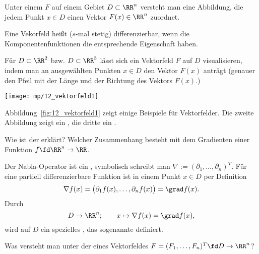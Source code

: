 \begin{antwort}
  Unter einem  $F$ auf einem Gebiet 
  $D\subset \RR^n$ versteht man eine Abbildung, die jedem Punkt $x\in D$ 
  einen Vektor $F(x)\in\RR^n$ zuordnet. 

  Eine Vekorfeld heißt ($s$-mal stetig) differenzierbar, wenn die 
  Komponentenfunktionen die entsprechende Eigenschaft haben.

  Für $D\subset\RR^2$ bzw. $D\subset\RR^3$ lässt sich ein Vektorfeld 
  $F$ auf $D$ visualisieren, indem man an ausgewählten 
  Punkten $x\in D$ den Vektor $F(x)$ anträgt (genauer den Pfeil mit der 
  Länge und der Richtung des Vektors $F(x)$.)

  \begin{center}
    \texttt{[image: mp/12\_vektorfeld1]}
    \label{fig:12_vektorfeld1}
  \end{center}

  Abbildung~\ref{fig:12_vektorfeld1} zeigt 
  einige Beispiele für Vektorfelder. Die zweite 
  Abbildung zeigt ein , die dritte ein 
  .\AntEnd
\end{antwort}

\begin{frage}\label{12_nabla}
  Wie ist der  erklärt? Welcher Zusammenhang besteht 
  mit dem Gradienten einer Funktion $f\fd \RR^n\to\RR$. 
\end{frage}

\begin{antwort}
  Der Nabla-Operator ist ein , 
  symbolisch schreibt man $\nabla := ( \partial_1, \ldots, \partial_n )^T$. 
  Für eine partiell differenzierbare Funktion ist in einem Punkt 
  $x\in D$ per Definition 
  \[
  \nabla f(x) = \big(\partial_1 f(x), \ldots, \partial_n f(x) \big) =
  \grad f(x).
  \]  
  Durch 
  \[
  D \to \RR^n; \qquad x \mapsto \nabla f(x) = \grad f(x),
  \]
  wird auf $D$ ein spezielles , das sogenannte 
   definiert. \AntEnd 
\end{antwort}

\begin{frage}
  Was versteht man unter der  eines Vektorfeldes 
  $F=(F_1,\ldots,F_n)^T \fd D\to\RR^n$?
\end{frage}

